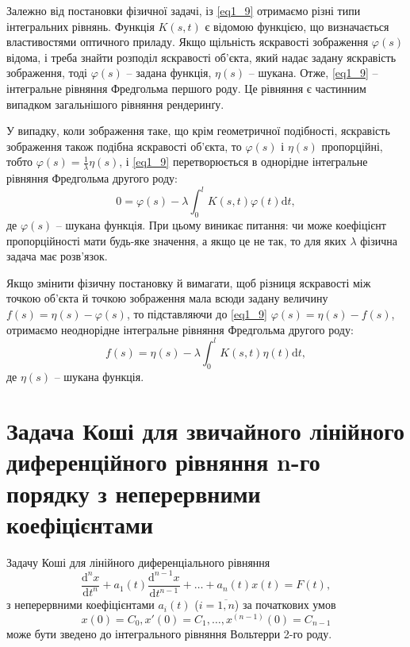 \documentclass[14pt,twoside]{extreport}
\theoremstyle{mystyle}
\numberwithin{equation}{chapter}
\begin{document}
Залежно від постановки фізичної задачі, із \eqref{eq1_9} отримаємо різні типи інтегральних рівнянь. Функція $K(s,t)$ є відомою функцією, що визначається властивостями оптичного приладу. Якщо щільність яскравості зображення $\varphi (s)$ відома, і треба знайти розподіл яскравості об'єкта, який надає задану яскравість зображення, тоді $\varphi (s)$ -- задана функція, $\eta(s)$ -- шукана. Отже, \eqref{eq1_9} -- інтегральне рівняння Фредгольма першого роду. Це рівняння є частинним випадком загальнішого рівняння рендеринґу.

У випадку, коли зображення таке, що крім геометричної подібності, яскравість зображення також подібна яскравості об'єкта, то $\varphi (s)$ і $\eta (s)$ пропорційні, тобто $\varphi (s)=\frac{1}{\lambda} \eta (s)$, і \eqref{eq1_9} перетворюється в однорідне інтегральне рівняння Фредгольма другого роду:
\[
0=\varphi(s)-\lambda \int _{0}^{l} K(s,t)\varphi (t)\mathrm{d}t,
\]
де $\varphi (s)$ -- шукана функція. При цьому виникає питання: чи може коефіцієнт пропорційності мати будь-яке значення, а якщо це не так, то для яких $\lambda$ фізична задача має розв'язок.

Якщо змінити фізичну постановку й вимагати, щоб різниця яскравості між точкою об'єкта й точкою зображення мала всюди задану величину $f(s)=\eta (s)-\varphi (s)$, то підставляючи до \eqref{eq1_9} $\varphi (s)=\eta (s)-f(s)$, отримаємо неоднорідне інтегральне рівняння Фредгольма другого роду:
\[
f(s)=\eta (s)-\lambda \int _{0}^{l} K(s,t)\eta (t)\mathrm{d}t,
\]
де $\eta(s)$ -- шукана функція.

\section{Задача Коші для звичайного лінійного диференційного рівняння n-го порядку з неперервними коефіцієнтами}

Задачу Коші для лінійного диференціального рівняння
\[
\frac{\mathrm{d}^{n} x}{\mathrm{d}t^{n}} + a_{1} (t)\frac{\mathrm{d}^{n-1}x}{\mathrm{d}t^{n-1}} + \ldots +a_{n} (t)x(t)=F(t),
\]
з неперервними коефіцієнтами $a_i(t)$ ($i=\overline{1,n}$) за початкових умов
\begin{equation*}
x(0)=C_{0} , x'(0)=C_{1}, \ldots, x^{(n-1)}(0)=C_{n-1}
\end{equation*}
може бути зведено до інтегрального рівняння Вольтерри 2-го роду.
\end{document}
